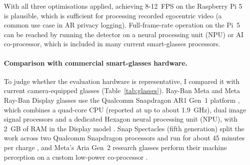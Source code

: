 With all three optimisations applied, achieving 8-12~FPS on the Raspberry Pi 5 is
plausible, which is sufficient for processing recorded egocentric video (a common
use case in AR privacy logging). Full-frame-rate operation on the Pi~5 can be reached by
running the detector on a neural processing unit (NPU) or AI co-processor, which
is included in many current smart-glasses processors.

\paragraph{Comparison with commercial smart-glasses hardware.}
To judge whether the evaluation hardware is representative, I compared it with
current camera-equipped glasses (Table~\ref{tab:glasses}). Ray-Ban Meta and Meta
Ray-Ban Display glasses use the Qualcomm Snapdragon AR1 Gen~1 platform
\citep{ref:qcom_ar1}, which combines a quad-core CPU (reported at up to about
1.9~GHz), dual image signal processors and a dedicated Hexagon neural processing unit
(NPU), with 2~GB of RAM in the Display model \citep{ref:gsmarena_display}. Snap
Spectacles (fifth generation) split the work across two Qualcomm Snapdragon processors
and run for about 45 minutes per charge \citep{ref:spectacles5}, and Meta's Aria
Gen~2 research glasses perform their machine perception on a custom low-power
co-processor \citep{ref:aria2}.

